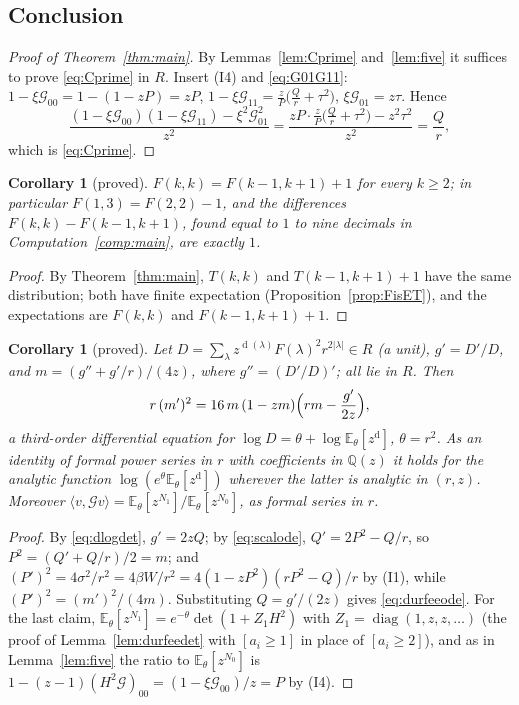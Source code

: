 \documentclass[11pt]{article}
\newtheorem{corollary}[theorem]{Corollary}
\theoremstyle{definition}
\theoremstyle{remark}
\newcommand{\E}{\mathbb{E}}
\DeclareMathOperator{\Durfee}{d}
\begin{document}
\subsection{Conclusion}\label{sec:proofend}

\begin{proof}[Proof of Theorem~\ref{thm:main}]
By Lemmas~\ref{lem:Cprime} and~\ref{lem:five} it suffices to prove \eqref{eq:Cprime} in $R$. Insert (I4) and \eqref{eq:G01G11}: $1-\xi\mathcal G_{00}=1-(1-zP)=zP$, $1-\xi\mathcal G_{11}=\frac zP\bigl(\frac Qr+\tau^2\bigr)$, $\xi\mathcal G_{01}=z\tau$. Hence
\[
\frac{(1-\xi\mathcal G_{00})(1-\xi\mathcal G_{11})-\xi^2\mathcal G_{01}^2}{z^2}
=\frac{zP\cdot\frac zP\bigl(\frac Qr+\tau^2\bigr)-z^2\tau^2}{z^2}=\frac Qr ,
\]
which is \eqref{eq:Cprime}.
\end{proof}

\begin{corollary}[proved]\label{cor:Fshift}
$F(k,k)=F(k-1,k+1)+1$ for every $k\ge2$; in particular $F(1,3)=F(2,2)-1$, and the differences $F(k,k)-F(k-1,k+1)$, found equal to $1$ to nine decimals in Computation~\ref{comp:main}, are exactly $1$.
\end{corollary}

\begin{proof}
By Theorem~\ref{thm:main}, $T(k,k)$ and $T(k-1,k+1)+1$ have the same distribution; both have finite expectation (Proposition~\ref{prop:FisET}), and the expectations are $F(k,k)$ and $F(k-1,k+1)+1$.
\end{proof}

\begin{corollary}[proved]\label{cor:durfeeode}
Let $D=\sum_\lambda z^{\Durfee(\lambda)}F(\lambda)^2r^{2|\lambda|}\in R$ (a unit), $g'=D'/D$, and $m=(g''+g'/r)/(4z)$, where $g''=(D'/D)'$; all lie in $R$. Then
\begin{equation}\label{eq:durfeeode}
r\,(m')^2=16\,m\,(1-zm)\Bigl(rm-\frac{g'}{2z}\Bigr),
\end{equation}
a third-order differential equation for $\log D=\theta+\log\E_\theta[z^{\Durfee}]$, $\theta=r^2$. As an identity of formal power series in $r$ with coefficients in $\mathbb Q(z)$ it holds for the analytic function $\log(e^\theta\E_\theta[z^{\Durfee}])$ wherever the latter is analytic in $(r,z)$. Moreover $\langle v,\mathcal Gv\rangle=\E_\theta[z^{N_1}]/\E_\theta[z^{N_0}]$, as formal series in $r$.
\end{corollary}

\begin{proof}
By \eqref{eq:dlogdet}, $g'=2zQ$; by \eqref{eq:scalode}, $Q'=2P^2-Q/r$, so $P^2=(Q'+Q/r)/2=m$; and $(P')^2=4\sigma^2/r^2=4\beta W/r^2=4(1-zP^2)(rP^2-Q)/r$ by (I1), while $(P')^2=(m')^2/(4m)$. Substituting $Q=g'/(2z)$ gives \eqref{eq:durfeeode}. For the last claim, $\E_\theta[z^{N_1}]=e^{-\theta}\det(1+Z_1H^2)$ with $Z_1=\operatorname{diag}(1,z,z,\dots)$ (the proof of Lemma~\ref{lem:durfeedet} with $[a_i\ge1]$ in place of $[a_i\ge2]$), and as in Lemma~\ref{lem:five} the ratio to $\E_\theta[z^{N_0}]$ is $1-(z-1)(H^2\mathcal G)_{00}=(1-\xi\mathcal G_{00})/z=P$ by (I4).
\end{proof}
\end{document}
